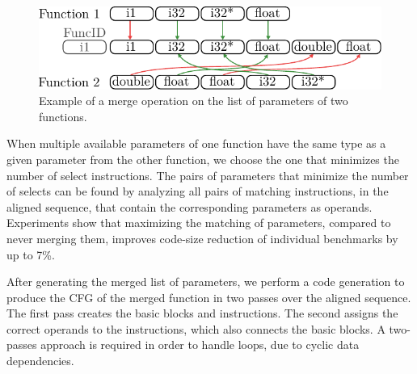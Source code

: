 \begin{figure}[h]
  \centering
  \includegraphics[width=0.9\linewidth]{figs/merged-params.pdf}
  \caption{Example of a merge operation on the list of parameters of two functions.}
  \label{fig:merged-params}
\end{figure}


When multiple available parameters of one function have the same type as a given
parameter from the other function, we choose the one that minimizes the number
of select instructions.
The pairs of parameters that minimize the number of selects can be found by
analyzing all pairs of matching instructions, in the aligned sequence, that
contain the corresponding parameters as operands.
Experiments show that maximizing the matching of parameters, compared to never
merging them, improves code-size reduction of individual benchmarks by up to 7\%.



After generating the merged list of parameters, we perform a code generation
to produce the CFG of the merged function in two passes over the aligned
sequence.
The first pass creates the basic blocks and instructions.
The second assigns the correct operands to the instructions, which also connects
the basic blocks.
A two-passes approach is required in order to handle loops, due to cyclic data
dependencies.

